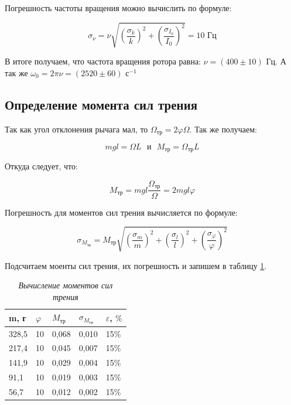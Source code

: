 \documentclass[a4paper,12pt]{article}
\begin{document}
Погрешность частоты вращения можно вычислить по формуле:

\begin{equation}
    \sigma_\nu = \nu \sqrt{ \left (\frac{\sigma_k}{k} \right)^2 + 
    \left (\frac{\sigma_{I_0}}{I_0}\right)^2 } = 10 \text{ Гц}
\end{equation}

В итоге получаем, что частота вращения ротора равна: $\nu = ( 400 \pm 10 ) \text{ Гц}$. А так же $\omega_0 = 2 \pi \nu = ( 2520 \pm 60 ) \text{ с}^{-1}$

\subsection{Определение момента сил трения}

Так как угол отклонения рычага мал, то $\Omega_\text{тр} = 2 \varphi \Omega$. Так же получаем:

\begin{equation}
    m g l = \Omega L \ \ \ \text{и} \ \ \ M_\text{тр} = \Omega_\text{тр} L
\end{equation}

Откуда следует, что:

\begin{equation}
    M_\text{тр} = mgl \frac{\Omega_\text{тр}}{\Omega} = 2 m g l \varphi
\end{equation}

Погрешность для моментов сил трения вычисляется по формуле:

\begin{equation}
    \sigma_{M_\text{тр}} = M_\text{тр} \sqrt{
    \left ( \frac{\sigma_{m}}{m} \right)^2 +
    \left ( \frac{\sigma_{l}}{l} \right)^2 +
    \left ( \frac{\sigma_{\varphi}}{\varphi} \right)^2
    }
\end{equation}

Подсчитаем моенты сил трения, их погрешность и запишем в таблицу \ref{friction}.

\begin{table}[!ht]
    \centering
    \begin{tabular}{|l|l|l|l|l|}
    \hline
        m, г & $\varphi$ & $M_\text{тр}$ & $\sigma_{M_\text{тр}}$ & $\varepsilon$, $\%$ \\ \hline
        328,5 & 10 & 0,068 & 0,010 & 15\% \\ \hline
        217,4 & 10 & 0,045 & 0,007 & 15\% \\ \hline
        141,9 & 10 & 0,029 & 0,004 & 15\% \\ \hline
        91,1 & 10 & 0,019 & 0,003 & 15\% \\ \hline
        56,7 & 10 & 0,012 & 0,002 & 15\% \\ \hline
    \end{tabular}\caption{\textit{Вычисление моментов сил трения}}\label{friction}
\end{table}
\end{document}
